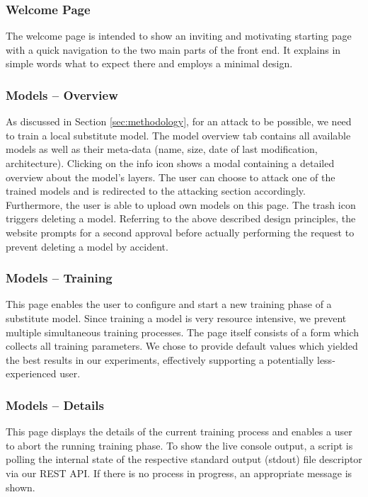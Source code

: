 \subsubsection{Welcome Page}
The welcome page is intended to show an inviting and motivating starting page with a quick navigation to the two main parts of the front end.
It explains in simple words what to expect there and employs a minimal design.

\subsubsection{Models -- Overview}
As discussed in Section \ref{sec:methodology}, for an attack to be possible, we need to train a local substitute model.
The model overview tab contains all available models as well as their meta-data (name, size, date of last modification, architecture).
Clicking on the info icon shows a modal containing a detailed overview about the model's layers.
The user can choose to attack one of the trained models and is redirected to the attacking section accordingly. 
Furthermore, the user is able to upload own models on this page.
The trash icon triggers deleting a model.
Referring to the above described design principles, the website prompts for a second approval before actually performing the request to prevent deleting a model by accident.

\subsubsection{Models -- Training}
This page enables the user to configure and start a new training phase of a substitute model. 
Since training a model is very resource intensive, we prevent multiple simultaneous training processes.
The page itself consists of a form which collects all training parameters.
We chose to provide default values which yielded the best results in our experiments, effectively supporting a potentially less-experienced user.

\subsubsection{Models -- Details}
This page displays the details of the current training process and enables a user to abort the running training phase.
To show the live console output, a script is polling the internal state of the respective standard output (stdout) file descriptor via our REST API. 
If there is no process in progress, an appropriate message is shown.


